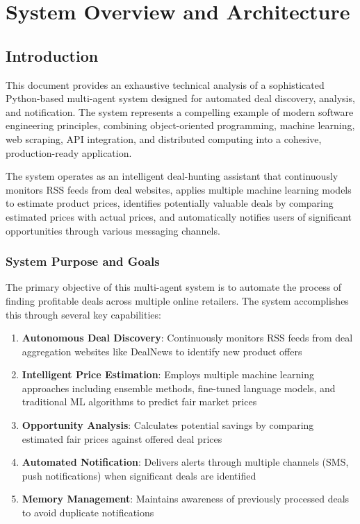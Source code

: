 \chapter{System Overview and Architecture}

\section{Introduction}

This document provides an exhaustive technical analysis of a sophisticated Python-based multi-agent system designed for automated deal discovery, analysis, and notification. The system represents a compelling example of modern software engineering principles, combining object-oriented programming, machine learning, web scraping, API integration, and distributed computing into a cohesive, production-ready application.

The system operates as an intelligent deal-hunting assistant that continuously monitors RSS feeds from deal websites, applies multiple machine learning models to estimate product prices, identifies potentially valuable deals by comparing estimated prices with actual prices, and automatically notifies users of significant opportunities through various messaging channels.

\subsection{System Purpose and Goals}

The primary objective of this multi-agent system is to automate the process of finding profitable deals across multiple online retailers. The system accomplishes this through several key capabilities:

\begin{enumerate}[itemsep=0.5em]
\item \textbf{Autonomous Deal Discovery}: Continuously monitors RSS feeds from deal aggregation websites like DealNews to identify new product offers
\item \textbf{Intelligent Price Estimation}: Employs multiple machine learning approaches including ensemble methods, fine-tuned language models, and traditional ML algorithms to predict fair market prices
\item \textbf{Opportunity Analysis}: Calculates potential savings by comparing estimated fair prices against offered deal prices
\item \textbf{Automated Notification}: Delivers alerts through multiple channels (SMS, push notifications) when significant deals are identified
\item \textbf{Memory Management}: Maintains awareness of previously processed deals to avoid duplicate notifications
\end{enumerate}

